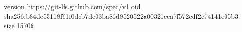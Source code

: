 version https://git-lfs.github.com/spec/v1
oid sha256:b84de55118f61f0dcb7dc03ba86d8520522a00321eca7f572cdf2c74141e05b3
size 15706

